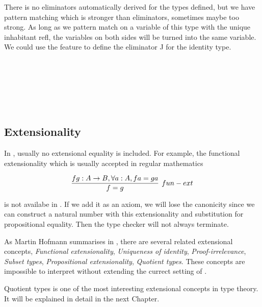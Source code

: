There is no eliminators automatically derived for the types defined, but we have pattern matching which is stronger than eliminators, sometimes maybe too strong. 
As long as we pattern match on a variable of this type with the unique inhabitant refl, the variables on both sides will be turned into the same variable. 
We could use the feature to define the eliminator J for the identity type.

\begin{code}
%
\\
\> \AgdaSymbol{:} \AgdaSymbol{(} \AgdaSymbol{:} \AgdaSymbol{)(} \AgdaSymbol{:} \AgdaSymbol{)}  \AgdaSymbol{(} \AgdaSymbol{:} \AgdaSymbol{(} \AgdaSymbol{:} \AgdaSymbol{)}      \AgdaSymbol{)}\<%
\\
\>[0]\<[2]%
\>[2]   \<%
\\
\>[0]\<[2]%
\>[2] \AgdaSymbol{(} \AgdaSymbol{:} \AgdaSymbol{)(} \AgdaSymbol{:}   \AgdaSymbol{)}    \<%
\\
\>       \AgdaSymbol{=} \<%
\\
%
\end{code}

\subsection{Extensionality}

In \itt, usually no extensional equality is included. For example, the functional extensionality which is usually accepted in regular mathematics

\begin{equation*}
\infer[fun-ext]{f = g}{f g : A \rightarrow B, \forall a : A, f a = g a}
\end{equation*}

is not availabe in \itt. If we add it as an axiom, we will lose the canonicity since we can construct a natural number with this extensionality and substitution for propositional equality. Then the type checker will not always terminate.

As Martin Hofmann summarises in \cite{mh:phd}, there are several related extensional concepts, \emph{Functional extensionality}, \emph{Uniqueness of identity}, \emph{Proof-irrelevance}, \emph{Subset types}, \emph{Propositional extensionality}, \emph{Quotient types}. These concepts are impossible to interpret without extending the currect setting of \itt{}.

Quotient types is one of the most interesting extensional concepts in type theory. It will be explained in detail in the next Chapter.

